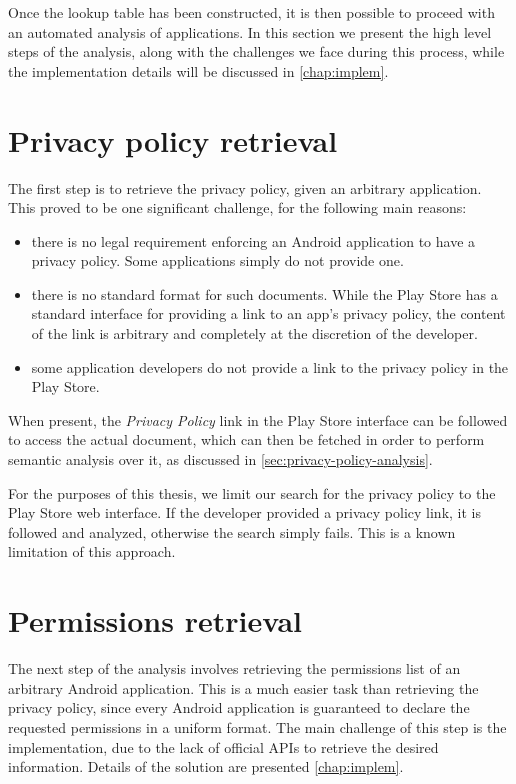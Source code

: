 
Once the lookup table has been constructed, it is then possible to proceed with an automated analysis of applications.
In this section we present the high level steps of the analysis, along with the challenges we face during this process, while the implementation details will be discussed in \autoref{chap:implem}.

\section{Privacy policy retrieval}
The first step is to retrieve the privacy policy, given an arbitrary application. This proved to be one significant challenge, for the following main reasons:
\begin{itemize}
    \item there is no legal requirement enforcing an Android application to have a privacy policy. Some applications simply do not provide one.
    \item there is no standard format for such documents. While the Play Store has a standard interface for providing a link to an app's privacy policy, the content of the link is arbitrary and completely at the discretion of the developer.
    \item some application developers do not provide a link to the privacy policy in the Play Store.
\end{itemize}

When present, the \emph{Privacy Policy} link in the Play Store interface can be followed to access the actual document, which can then be fetched in order to perform semantic analysis over it, as discussed in \autoref{sec:privacy-policy-analysis}.

For the purposes of this thesis, we limit our search for the privacy policy to the Play Store web interface. If the developer provided a privacy policy link, it is followed and analyzed, otherwise the search simply fails. This is a known limitation of this approach.

\section{Permissions retrieval}
The next step of the analysis involves retrieving the permissions list of an arbitrary Android application. This is a much easier task than retrieving the privacy policy, since every Android application is guaranteed to declare the requested permissions in a uniform format. The main challenge of this step is the implementation, due to the lack of official APIs to retrieve the desired information. Details of the solution are presented \autoref{chap:implem}.

